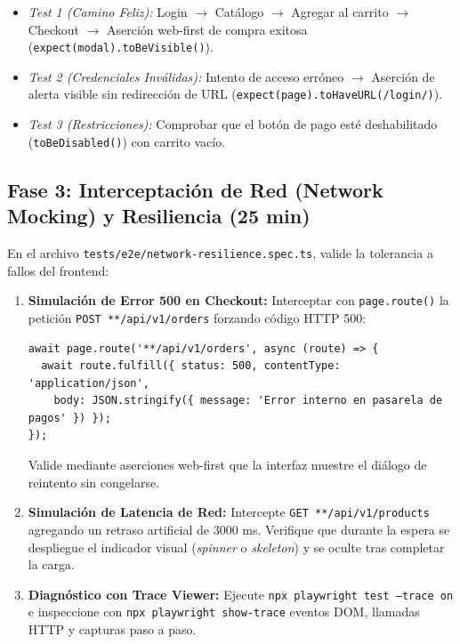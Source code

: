 \documentclass[10pt,letterpaper]{article}
\begin{document}
\begin{enumerate}[leftmargin=*,label=\textbf{\alph*)},itemsep=1.5pt,topsep=1.5pt]
    \begin{itemize}[itemsep=1pt]
      \item \textit{Test 1 (Camino Feliz):} Login $\rightarrow$ Catálogo $\rightarrow$ Agregar al carrito $\rightarrow$ Checkout $\rightarrow$ Aserción web-first de compra exitosa (\texttt{expect(modal).toBeVisible()}).
      \item \textit{Test 2 (Credenciales Inválidas):} Intento de acceso erróneo $\rightarrow$ Aserción de alerta visible sin redirección de URL (\texttt{expect(page).toHaveURL(/login/)}).
      \item \textit{Test 3 (Restricciones):} Comprobar que el botón de pago esté deshabilitado (\texttt{toBeDisabled()}) con carrito vacío.
    \end{itemize}
\end{enumerate}

\newpage

\subsection{Fase 3: Interceptación de Red (Network Mocking) y Resiliencia (25 min)}
En el archivo \texttt{tests/e2e/network-resilience.spec.ts}, valide la tolerancia a fallos del frontend:
\begin{enumerate}[leftmargin=*,label=\textbf{\alph*)},itemsep=1.5pt,topsep=1.5pt]
  \item \textbf{Simulación de Error 500 en Checkout:} Interceptar con \texttt{page.route()} la petición \texttt{POST **/api/v1/orders} forzando código HTTP 500:
    \begin{lstlisting}[style=codeStyle]
await page.route('**/api/v1/orders', async (route) => {
  await route.fulfill({ status: 500, contentType: 'application/json',
    body: JSON.stringify({ message: 'Error interno en pasarela de pagos' }) });
});
    \end{lstlisting}
    Valide mediante aserciones web-first que la interfaz muestre el diálogo de reintento sin congelarse.
  \item \textbf{Simulación de Latencia de Red:} Intercepte \texttt{GET **/api/v1/products} agregando un retraso artificial de 3000 ms. Verifique que durante la espera se despliegue el indicador visual (\textit{spinner} o \textit{skeleton}) y se oculte tras completar la carga.
  \item \textbf{Diagnóstico con Trace Viewer:} Ejecute \texttt{npx playwright test --trace on} e inspeccione con \texttt{npx playwright show-trace} eventos DOM, llamadas HTTP y capturas paso a paso.
\end{enumerate}
\end{document}
